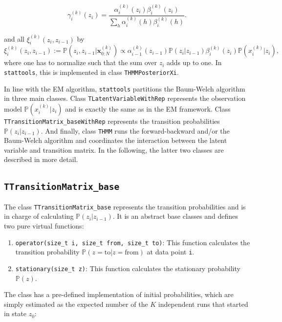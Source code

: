 \documentclass[a4paper,11pt]{article}
\def\x{\boldsymbol{x}}
\def\p{\mathbb{P}}
\def\stattools{\texttt{stattools}}
\newcommand{\class}[1]{\texttt{#1}}
\newcommand{\func}[1]{\texttt{#1}}
\newcommand{\variable}[1]{\texttt{#1}}
\begin{document}
\begin{equation*}
\gamma_i^{(k)}(z_i) = \frac{\alpha_i^{(k)}(z_i)\beta_i^{(k)}(z_i)}{\sum_{h}\alpha_i^{(k)}(h)\beta_i^{(k)}(h)}.
\end{equation*}

and all $\xi_i^{(k)}(z_i , z_{i-1})$ by
\begin{equation}\label{eq:xi_baum_welch}
\xi_i^{(k)}(z_i , z_{i-1}) := \p(z_i, z_{i-1}| \x_{0:N}^{(k)})  \propto \alpha_{i-1}^{(k)}(z_{i-1}) \p(z_i | z_{i-1}) \beta_i^{(k)}(z_i) \p(x_i^{(k)} | z_i),
\end{equation}
where one has to normalize such that the sum over $z_i$ adds up to one. In \stattools{}, this is implemented in class \class{THMMPosteriorXi}.


In line with the EM algorithm, \stattools{} partitions the Baum-Welch algorithm in three main classes. Class \class{TLatentVariableWithRep} represents the observation model $\p(x_i^{(k)} | z_i)$ and is exactly the same as in the EM framework. Class \class{TTransitionMatrix\_baseWithRep} represents the transition probabilities $\p(z_{i} | z_{i-1})$. And finally, class \class{THMM} runs the forward-backward and/or the Baum-Welch algorithm and coordinates the interaction between the latent variable and transition matrix. In the following, the latter two classes are described in more detail.

\subsection{\class{TTransitionMatrix\_base}}

The class \class{TTransitionMatrix\_base} represents the transition probabilities and is in charge of calculating $\p(z_i | z_{i-1})$. It is an abstract base classes and defines two pure virtual functions:

\begin{enumerate}
 \item \func{operator(size\_t i, size\_t from, size\_t to)}: This function calculates the transition probability $\p(z = \mbox{to} | z = \mbox{from})$ at data point \variable{i}.

 \item \func{stationary(size\_t z)}: This function calculates the stationary probability $\p(z)$.
\end{enumerate}

The class has a pre-defined implementation of initial probabilities, which are simply estimated as the expected number of the $K$ independent runs that started in state $z_0$:
\end{document}
